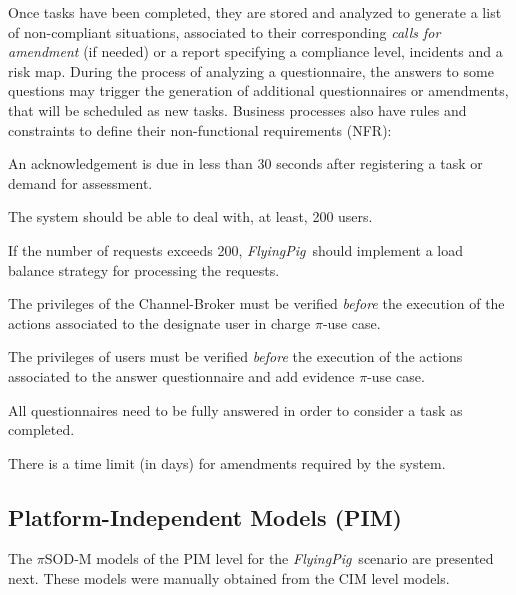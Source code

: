 \documentclass{singlecol-new}
\theoremstyle{TH}{
\newtheorem{lemma}{Lemma}
\newtheorem{theorem}[lemma]{Theorem}
\newtheorem{corrolary}[lemma]{Corrolary}
\newtheorem{conjecture}[lemma]{Conjecture}
\newtheorem{proposition}[lemma]{Proposition}
\newtheorem{claim}[lemma]{Claim}
\newtheorem{stheorem}[lemma]{Wrong Theorem}
\newtheorem{algorithm}{Algorithm}
}
\theoremstyle{THrm}{
\newtheorem{definition}{Definition}[section]
\newtheorem{question}{Question}[section]
\newtheorem{remark}{Remark}
\newtheorem{scheme}{Scheme}
}
\theoremstyle{THhit}{
\newtheorem{case}{Case}[section]
}
\theoremstyle{THhsl}{
\newtheorem{example}{Example}
}
\newcommand{\pisodm}[0]{$\pi$SOD-M\xspace}
\def\FlyingPig{\textsl{FlyingPig}\xspace}
\begin{document}
Once tasks have been completed, they are stored and analyzed to generate a list of non-compliant situations, associated to their corresponding \textit{calls for amendment} (if needed) or a report specifying a compliance level, incidents and a risk map.
During the process of analyzing a questionnaire, the answers to some questions may trigger the generation of additional questionnaires or amendments, that will be scheduled as new tasks.
Business processes also have rules and constraints to define their non-functional requirements (NFR):

\begin{compactenum}
\item An acknowledgement is due in less than 30 seconds after registering a task or demand for assessment.
\item The system should be able to deal with, at least, 200 users.
\item If the number of requests exceeds 200, \FlyingPig\ should implement a load balance strategy for processing the requests.
\item The privileges of the Channel-Broker must be verified \textit{before} the execution of the actions associated to the \textsf{designate user in charge} $\pi$-use case.
\item The privileges of users must be verified \textit{before} the execution of the actions associated to the \textsf{answer questionnaire and add evidence} $\pi$-use case.
\item All questionnaires need to be fully answered in order to consider a task as completed.
\item There is a time limit (in days) for amendments required by the system.
\end{compactenum}

\subsection{Platform-Independent Models (PIM)}

The \pisodm models of the PIM level  for the \FlyingPig\ scenario are presented next.
These models were manually obtained from the CIM level models.



\end{document}
